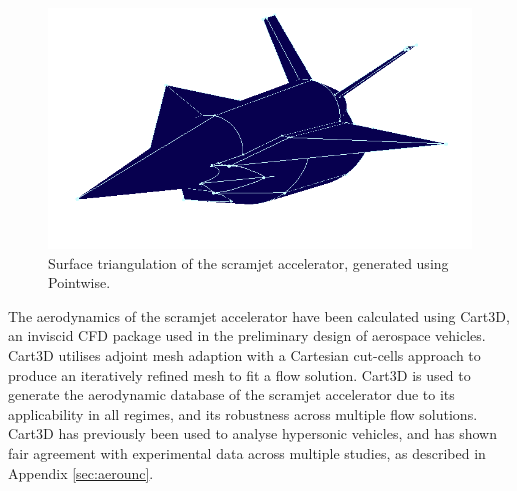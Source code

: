 \begin{figure}[ht]
	\centering
	\includegraphics[width=0.6\linewidth]{figures/3_vehicle_design/Pointwise}
	\caption{Surface triangulation of the scramjet accelerator, generated using Pointwise\cite{Pointwise}.}
	\label{fig:Pointwise}
\end{figure}

The aerodynamics of the scramjet accelerator have been calculated using Cart3D, an inviscid CFD package used in the preliminary design of aerospace vehicles. Cart3D utilises adjoint mesh adaption with a Cartesian cut-cells approach to produce an iteratively refined mesh to fit a flow solution. Cart3D is used to generate the aerodynamic database of the scramjet accelerator due to its applicability in all regimes, and its robustness across multiple flow solutions\cite{Sagerman2017,Abeynayake,Aftosmis2011,Almosnino2016a,Gomez2004,Ward2018,Kiris2011}. Cart3D has previously been used to
analyse hypersonic vehicles, and has shown fair agreement with experimental data across multiple studies\cite{Abeynayake2013a,Ward2018,Kiris2011}, as described in Appendix \textcolor{black}{\ref{sec:aerounc}}.

